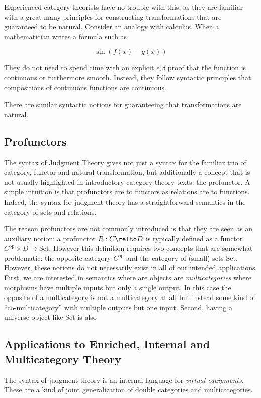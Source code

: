 \documentclass[a4paper,UKenglish,cleveref, autoref, thm-restate]{lipics-v2021}
\begin{document}
Experienced category theorists have no trouble with this, as they are
familiar with a great many principles for constructing transformations
that are guaranteed to be natural. Consider an analogy with
calculus. When a mathematician writes a formula such as

$$\sin(f(x) - g(x))$$

They do not need to spend time with an explicit $\epsilon,\delta$
proof that the function is continuous or furthermore smooth. Instead,
they follow syntactic principles that compositions of continuous
functions are continuous.

There are similar syntactic notions for guaranteeing that
transformations are natural.

\subsection{Profunctors}

The syntax of Judgment Theory gives not just a syntax for the familiar
trio of category, functor and natural transformation, but additionally
a concept that is not usually highlighted in introductory category
theory texts: the profunctor. A simple intuition is that profunctors
are to functors as relations are to functions. Indeed, the syntax for
judgment theory has a straightforward semantics in the category of
sets and relations.

The reason profunctors are not commonly introduced is that they are
seen as an auxiliary notion: a profunctor $R : C \relto D$ is
typically defined as a functor $C^{\textrm{op}}\times D \to
\textrm{Set}$. However this definition requires two concepts that are
somewhat problematic: the opposite category $C^\textrm{op}$ and the
category of (small) sets $\textrm{Set}$. However, these notions do not
necessarily exist in all of our intended applications. First, we are
interested in semantics where are objects are \emph{multicategories}
where morphisms have multiple inputs but only a single output. In this
case the opposite of a multicategory is not a multicategory at all but
instead some kind of ``co-multicategory'' with multiple outputs but
one input. Second, having a universe object like $\textrm{Set}$ is also

\subsection{Applications to Enriched, Internal and Multicategory Theory}

The syntax of judgment theory is an internal language for
\emph{virtual equipments}. These are a kind of joint generalization of
double categories and multicategories.
\end{document}
